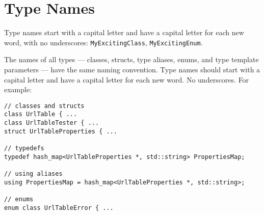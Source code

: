 
\section{Type Names}\label{sec:type-names}
Type names start with a capital letter and have a capital letter for each new word, with no underscores: \texttt{MyExcitingClass}, \texttt{MyExcitingEnum}.

The names of all types — classes, structs, type aliases, enums, and type template parameters — have the same naming convention. Type names should start with a capital letter and have a capital letter for each new word. No underscores. For example:
\begin{verbatim}
// classes and structs
class UrlTable { ...
class UrlTableTester { ...
struct UrlTableProperties { ...

// typedefs
typedef hash_map<UrlTableProperties *, std::string> PropertiesMap;

// using aliases
using PropertiesMap = hash_map<UrlTableProperties *, std::string>;

// enums
enum class UrlTableError { ...
\end{verbatim}
